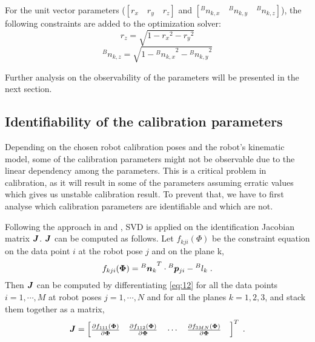 For the unit vector parameters ($[r_x \quad r_y \quad r_z ]$ and  $[{^B}n_{k,x} \quad {^B}n_{k,y} \quad {^B}n_{k,z}]$), the following constraints are added to the optimization solver:
\begin{equation}
\label{eq:10}
{r_z} = \sqrt{1 - {r_x}^2 - {r_y}^2}
\end{equation}
\begin{equation}
\label{eq:11}
{^B}n_{k,z} = \sqrt{1 - {{^B}n_{k,x}}^2 - {{^B}n_{k,y}}^2}
\end{equation}

Further analysis on the observability of the parameters will be presented in the next section. 

\subsection{Identifiability of the calibration parameters}
\label{sec:third_step}

Depending on the chosen robot calibration poses and the robot's kinematic model, some of the calibration parameters might not be observable due to the linear dependency among the parameters. This is a critical problem in calibration, as it will result in some of the parameters assuming erratic values which gives us unstable calibration result. To prevent that, we have to first analyse which calibration parameters are identifiable and which are not. 

Following the approach in \cite{Joubair2015} and \cite{Hollerbach1996}, SVD is applied on the identification Jacobian matrix $\vb*{J}$. $\vb*{J}$ can be computed as follows. Let  $f_{kji}(\Phi)$ be the constraint equation on the data point $i$ at the robot pose $j$ and on the plane k, 
\begin{equation}
\label{eq:12}
 f_{kji}(\vb*{\Phi}) =  {{^B}\vb*{n}_k}^T \cdot {^B}\vb*{p}_{ji} - {^B}l_k \; .
\end{equation}
Then $\vb*{J}$ can be computed by differentiating \eqref{eq:12} for all the data points $i = 1, \cdots, M$ at robot poses $j = 1, \cdots, N$ and for all the planes $k=1,2,3$, and stack them together as a matrix,
\renewcommand\arraystretch{1.5}
\begin{equation}
\vb*{J} = \begin{bmatrix}
 \frac{\partial f_{111}(\vb*{\Phi})}{\partial\vb*{\Phi}} \quad
 \frac{\partial f_{112}(\vb*{\Phi})}{\partial\vb*{\Phi}} \quad
 \cdots  \quad
 \frac{\partial f_{3MN}(\vb*{\Phi})}{\partial\vb*{\Phi}} \quad
	\end{bmatrix} ^T \; .
\end{equation}

